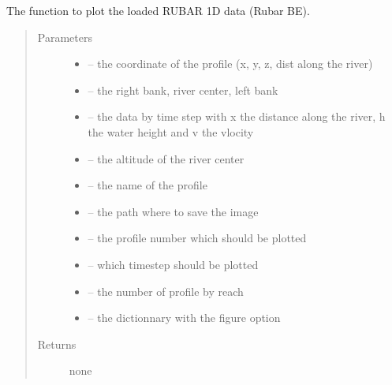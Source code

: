 \documentclass[letterpaper,10pt,english]{sphinxmanual}
\begin{document}
\begin{fulllineitems}
\label{\detokenize{index:src.rubar.figure_rubar1d}}
The function to plot the loaded RUBAR 1D data (Rubar BE).
\begin{quote}\begin{description}
\item[{Parameters}] \leavevmode\begin{itemize}
\item {} 
 -- the coordinate of the profile (x, y, z, dist along the river)

\item {} 
 -- the right bank, river center, left bank

\item {} 
 -- the data by time step with x the distance along the river, h the water height and v the vlocity

\item {} 
 -- the altitude of the river center

\item {} 
 -- the name of the profile

\item {} 
 -- the path where to save the image

\item {} 
 -- the profile number which should be plotted

\item {} 
 -- which timestep should be plotted

\item {} 
 -- the number of profile by reach

\item {} 
 -- the dictionnary with the figure option

\end{itemize}

\item[{Returns}] \leavevmode
none

\end{description}\end{quote}

\end{fulllineitems}
\end{document}
